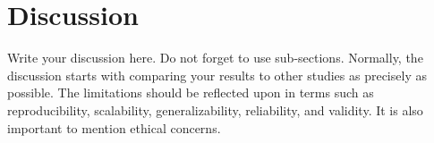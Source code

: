 \section{Discussion}
\label{sec:discussion}
Write your discussion here. Do not forget to use sub-sections. Normally, the discussion starts with comparing your results to other studies as precisely as possible. The limitations should be reflected upon in terms such as reproducibility, scalability,  generalizability, reliability, and validity. It is also important to mention ethical concerns.